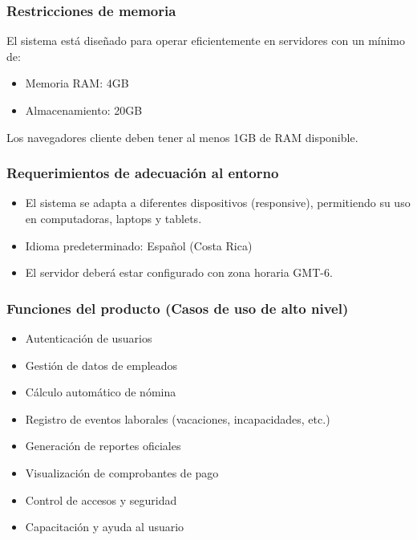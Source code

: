 \subsubsection*{Restricciones de memoria}

El sistema está diseñado para operar eficientemente en servidores con un mínimo de:

\begin{itemize}
	\item Memoria RAM: 4GB
	\item Almacenamiento: 20GB
\end{itemize}

Los navegadores cliente deben tener al menos 1GB de RAM disponible.

\subsubsection*{Requerimientos de adecuación al entorno}

\begin{itemize}
	\item El sistema se adapta a diferentes dispositivos (responsive), permitiendo su uso en computadoras, laptops y tablets.
	\item Idioma predeterminado: Español (Costa Rica)
	\item El servidor deberá estar configurado con zona horaria GMT-6.
\end{itemize}

\subsubsection*{Funciones del producto (Casos de uso de alto nivel)}

\begin{itemize}
	\item Autenticación de usuarios
	\item Gestión de datos de empleados
	\item Cálculo automático de nómina
	\item Registro de eventos laborales (vacaciones, incapacidades, etc.)
	\item Generación de reportes oficiales
	\item Visualización de comprobantes de pago
	\item Control de accesos y seguridad
	\item Capacitación y ayuda al usuario
\end{itemize}


